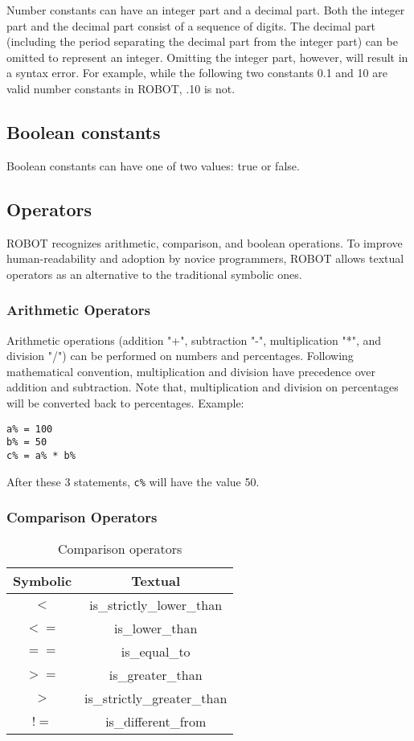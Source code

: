 \documentclass[a4paper]{article}
\begin{document}
Number constants can have an integer part and a decimal part.  Both the integer part and the decimal part consist of a sequence of digits.  The decimal part (including the period separating the decimal part from the integer part) can be omitted to represent an integer.  Omitting the integer part, however, will result in a syntax error.  For example, while the following two constants 0.1 and 10 are valid number constants in ROBOT, .10 is not.

\subsection{Boolean constants}

Boolean constants can have one of two values:  true or false.

\subsection{Operators}

ROBOT recognizes arithmetic, comparison, and boolean operations.  To improve human-readability and adoption by novice programmers, ROBOT allows textual operators as an alternative to the traditional symbolic ones.

\subsubsection{Arithmetic Operators}

Arithmetic operations (addition "+", subtraction "-", multiplication "*", and division "/") can be performed on numbers and percentages.  Following mathematical convention, multiplication and division have precedence over addition and subtraction.  Note that, multiplication and division on percentages will be converted back to percentages. Example:
\begin{verbatim}
a% = 100
b% = 50
c% = a% * b%
\end{verbatim}
After these 3 statements, \texttt{c\%} will have the value 50.

\subsubsection{Comparison Operators}

\begin{table}[h!]
	\centering
	\begin{tabular}{|c|c|}
		\hline
		Symbolic & Textual\\
		\hline
		$<$ & is\_strictly\_lower\_than\\
		\hline
		$<=$ & is\_lower\_than\\
		\hline
		$==$ & is\_equal\_to\\
		\hline
		$>=$ & is\_greater\_than\\
		\hline
		$>$ & is\_strictly\_greater\_than\\
		\hline
		$!=$ & is\_different\_from\\
		\hline
	\end{tabular}
	\caption{Comparison operators}
\end{table}
\end{document}
